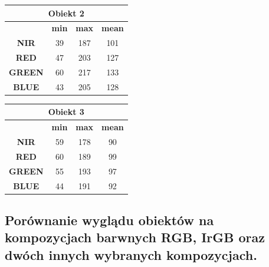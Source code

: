 \documentclass[a4paper,12pt]{article}  %
\begin{document}
\begin{table}[h!]
\centering
\begin{tabular}{|c|c|c|c|}
\hline
\multicolumn{4}{|c|}{\textbf{Obiekt 2}} \\ \hline
\textbf{} & \textbf{min} & \textbf{max} & \textbf{mean} \\ \hline
\textbf{NIR} & 39 & 187 & 101\\ \hline
\textbf{RED} & 47 & 203 & 127\\ \hline
\textbf{GREEN} & 60 & 217 & 133\\ \hline
\textbf{BLUE} & 43 & 205 & 128\\ \hline
\end{tabular}
\end{table}

\begin{table}[h!]
\centering
\begin{tabular}{|c|c|c|c|}
\hline
\multicolumn{4}{|c|}{\textbf{Obiekt 3}} \\ \hline
\textbf{} & \textbf{min} & \textbf{max} & \textbf{mean} \\ \hline
\textbf{NIR} & 59 & 178 & 90\\ \hline
\textbf{RED} & 60 & 189 & 99\\ \hline
\textbf{GREEN} & 55 & 193 & 97\\ \hline
\textbf{BLUE} & 44 & 191 & 92\\ \hline
\end{tabular}
\end{table}

\newpage
\subsection{Porównanie wyglądu obiektów na kompozycjach barwnych RGB, IrGB oraz dwóch innych wybranych kompozycjach.}
\end{document}
